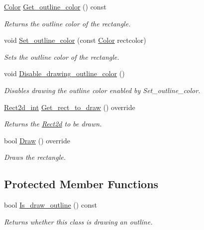 \begin{DoxyCompactItemize}
\hyperlink{classjetfuel_1_1draw_1_1Color}{Color} \hyperlink{classjetfuel_1_1draw_1_1Rectangle__2d__shape_a63a682ca90cc17cc993253757296c999}{Get\+\_\+outline\+\_\+color} () const
\begin{DoxyCompactList}\small\item\em Returns the outline color of the rectangle. \end{DoxyCompactList}\item 
void \hyperlink{classjetfuel_1_1draw_1_1Rectangle__2d__shape_a7a090088081738c7f342e193e519de5a}{Set\+\_\+outline\+\_\+color} (const \hyperlink{classjetfuel_1_1draw_1_1Color}{Color} rectcolor)
\begin{DoxyCompactList}\small\item\em Sets the outline color of the rectangle. \end{DoxyCompactList}\item 
void \hyperlink{classjetfuel_1_1draw_1_1Rectangle__2d__shape_a505b8a9c99a2a552d680d7fa1a7622d9}{Disable\+\_\+drawing\+\_\+outline\+\_\+color} ()
\begin{DoxyCompactList}\small\item\em Disables drawing the outline color enabled by Set\+\_\+outline\+\_\+color. \end{DoxyCompactList}\item 
\hyperlink{classjetfuel_1_1draw_1_1Rect2d}{Rect2d\+\_\+int} \hyperlink{classjetfuel_1_1draw_1_1Rectangle__2d__shape_a1ed2975565e629d2b8d3fffa0a4756b2}{Get\+\_\+rect\+\_\+to\+\_\+draw} () override
\begin{DoxyCompactList}\small\item\em Returns the \hyperlink{classjetfuel_1_1draw_1_1Rect2d}{Rect2d} to be drawn. \end{DoxyCompactList}\item 
bool \hyperlink{classjetfuel_1_1draw_1_1Rectangle__2d__shape_aba19e63d55c824de135932483fe40fcb}{Draw} () override
\begin{DoxyCompactList}\small\item\em Draws the rectangle. \end{DoxyCompactList}\end{DoxyCompactItemize}
\subsection*{Protected Member Functions}
\begin{DoxyCompactItemize}
\item 
bool \hyperlink{classjetfuel_1_1draw_1_1Rectangle__2d__shape_a10cb5ef4b0d1b10b9d1b1bf32a805613}{Is\+\_\+draw\+\_\+outline} () const
\begin{DoxyCompactList}\small\item\em Returns whether this class is drawing an outline. \end{DoxyCompactList}\end{DoxyCompactItemize}


